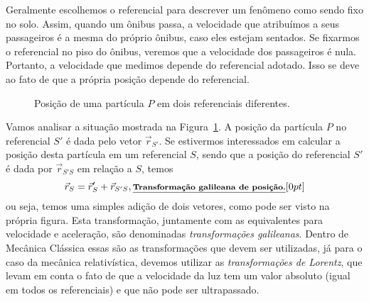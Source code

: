 Geralmente escolhemos o referencial para descrever um fenômeno como sendo fixo no solo. Assim, quando um ônibus passa, a velocidade que atribuímos a seus passageiros é a mesma do próprio ônibus, caso eles estejam sentados. Se fixarmos o referencial no piso do ônibus, veremos que a velocidade dos passageiros é nula. Portanto, a velocidade que medimos depende do referencial adotado. Isso se deve ao fato de que a própria posição depende do referencial.

\begin{figure}[!h]
\centering
{}
\caption{Posição de uma partícula $P$ em dois referenciais diferentes. \label{Fig:Ref_mov_relativo}}
\end{figure}

Vamos analisar a situação mostrada na Figura~\ref{Fig:Ref_mov_relativo}. A posição da partícula $P$ no referencial $S'$ é dada pelo vetor $\vec{r}_{S'}$. Se estivermos interessados em calcular a posição desta partícula em um referencial $S$, sendo que a posição do referencial $S'$ é dada por $\vec{r}_{S'S}$ em relação a $S$, temos
\begin{equation}
  \vec{r}_S = \vec{r}_S' + \vec{r}_{S'S},\relax{\footnotesize\emph{\textbf{Transformação galileana de posição.}}}[0pt]
\end{equation}
%
ou seja, temos uma simples adição de dois vetores, como pode ser visto na própria figura. Esta transformação, juntamente com as equivalentes para velocidade e aceleração, são denominadas \emph{transformações galileanas}. Dentro de Mecânica Clássica essas são as transformações que devem ser utilizadas, já para o caso da mecânica relativística, devemos utilizar as \emph{transformações de Lorentz}, que levam em conta o fato de que a velocidade da luz tem um valor absoluto (igual em todos os referenciais) e que não pode ser ultrapassado.

